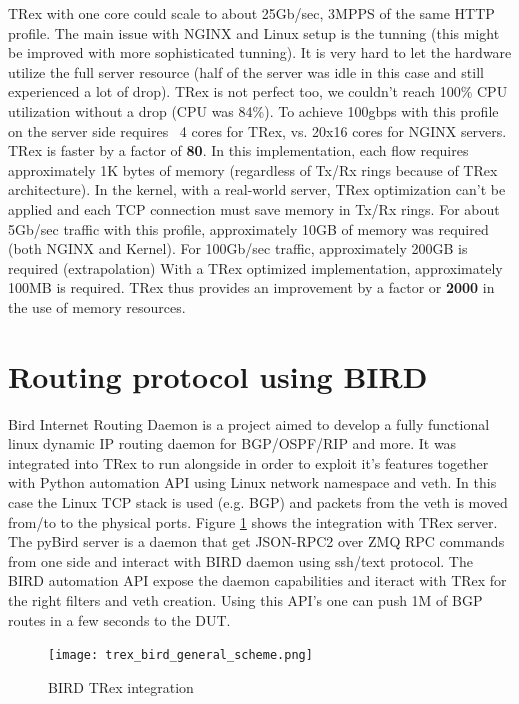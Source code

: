 \documentclass[letterpaper]{article}
\begin{document}
TRex with one core could scale to about 25Gb/sec, 3MPPS of the same HTTP profile.
The main issue with NGINX and Linux setup is the tunning (this might be improved with more sophisticated tunning). 
It is very hard to let the hardware utilize the full server resource (half of the server was idle in this case and still experienced a lot of drop). 
TRex is not perfect too, we couldn't reach 100\% CPU utilization without a drop (CPU was 84\%). To achieve 100gbps with this profile on the server side requires ~4 cores for TRex, vs. 20x16 cores for NGINX servers. 
TRex is faster by a factor of \textbf{80}. In this implementation, each flow requires approximately 1K bytes of memory (regardless of Tx/Rx rings because of TRex architecture). 
In the kernel, with a real-world server, TRex optimization can't be applied and each TCP connection must save memory in Tx/Rx rings.
For about 5Gb/sec traffic with this profile, approximately 10GB of memory was required (both NGINX and Kernel). For 100Gb/sec traffic, approximately 200GB is required (extrapolation)  With a TRex optimized implementation, approximately 100MB is required. 
TRex thus provides an improvement by a factor or \textbf{2000} in the use of memory resources.

\section{Routing protocol using BIRD}

Bird Internet Routing Daemon \cite{b4} is a project aimed to develop a fully functional linux dynamic IP routing daemon for BGP/OSPF/RIP and more. 
It was integrated into TRex to run alongside in order to exploit it’s features together with Python automation API using Linux network namespace and veth. 
In this case the Linux TCP stack is used (e.g. BGP) and packets from the veth is moved from/to to the physical ports. 
Figure \ref{fig:bird} shows the integration with TRex server. The pyBird server is a daemon that get JSON-RPC2 over ZMQ RPC commands from one side and interact with BIRD daemon using ssh/text protocol. 
The BIRD automation API expose the daemon capabilities and iteract with TRex for the right filters and veth creation. Using this API's one can push 1M of BGP routes in a few seconds to the DUT.

\begin{figure}[h]
\texttt{[image: trex\_bird\_general\_scheme.png]}
\caption{BIRD TRex integration}
\label{fig:bird}
\end{figure}
\end{document}
